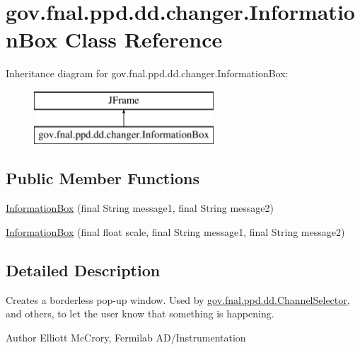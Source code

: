 \hypertarget{classgov_1_1fnal_1_1ppd_1_1dd_1_1changer_1_1InformationBox}{\section{gov.\-fnal.\-ppd.\-dd.\-changer.\-Information\-Box Class Reference}
\label{classgov_1_1fnal_1_1ppd_1_1dd_1_1changer_1_1InformationBox}
}
Inheritance diagram for gov.\-fnal.\-ppd.\-dd.\-changer.\-Information\-Box\-:\begin{figure}[H]
\begin{center}
\leavevmode
\includegraphics[height=2.000000cm]{classgov_1_1fnal_1_1ppd_1_1dd_1_1changer_1_1InformationBox}
\end{center}
\end{figure}
\subsection*{Public Member Functions}
\begin{DoxyCompactItemize}
\item 
\hyperlink{classgov_1_1fnal_1_1ppd_1_1dd_1_1changer_1_1InformationBox_af8402f5e938b1de270eaab3dbbe721c9}{Information\-Box} (final String message1, final String message2)
\item 
\hyperlink{classgov_1_1fnal_1_1ppd_1_1dd_1_1changer_1_1InformationBox_a8274489d9cff0a9ab9e8f20e4bde9ec7}{Information\-Box} (final float scale, final String message1, final String message2)
\end{DoxyCompactItemize}


\subsection{Detailed Description}
Creates a borderless pop-\/up window. Used by \hyperlink{classgov_1_1fnal_1_1ppd_1_1dd_1_1ChannelSelector}{gov.\-fnal.\-ppd.\-dd.\-Channel\-Selector}, and others, to let the user know that something is happening.

\begin{DoxyAuthor}{Author}
Elliott Mc\-Crory, Fermilab A\-D/\-Instrumentation 
\end{DoxyAuthor}


